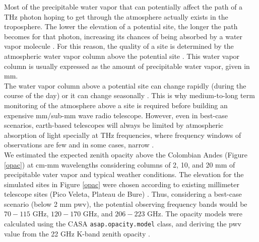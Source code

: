 \documentclass[12pt]{iopart}
\begin{document}
Most of the precipitable water vapor that can potentially affect the path of a THz photon hoping to get through the atmosphere actually exists in the troposphere. The lower the elevation of a potential site, the longer the path becomes for that photon, increasing its chances of being absorbed by a water vapor molecule \cite{liebe1989mpm,linecont,lababs}. For this reason, the quality of a site is determined by the atmospheric water vapor column above the potential site \cite{mkradio,southpole3,he2012,atacama}. This water vapor column is usually expressed as the amount of precipitable water vapor, given in mm.\\

The water vapor column above a potential site can change rapidly (during the course of the day) or it can change seasonally \cite{arm2013,caumont2016}. This is why medium-to-long term monitoring of the atmosphere above a site is required before building an expensive mm/sub-mm wave radio telescope. However, even in best-case scenarios, earth-based telescopes will always be limited by atmospheric absorption of light specially at THz frequencies, where frequency windows of observations are few and in some cases, narrow \cite{arrlim,limits}.\\ 

We estimated the expected zenith opacity above the Colombian Andes (Figure \ref{opac}) at cm-mm wavelengths considering columns of 2, 10, and 20 mm of precipitable vater vapor and typical weather conditions. The elevation for the simulated sites in Figure \ref{opac} were chosen according to existing millimeter telescope sites (Pico Veleta, Plateau de Bure) \cite{mminf}. Thus, considering a best-case scenario (below 2 mm pwv), the potential observing frequency bands would be $70-115$ GHz, $120-170$ GHz, and $206-223$ GHz. The opacity models were calculated using the CASA \cite{casa} \texttt{asap.opacity.model} class, and deriving the pwv value from the 22 GHz K-band zenith opacity \cite{deuber,sanpedromartir}. \\
\end{document}
